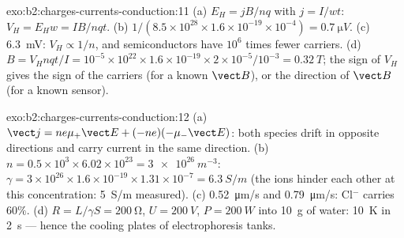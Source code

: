 \begin{solution}{exo:b2:charges-currents-conduction:11}
(a) $E_H = jB/nq$ with $j = I/wt$: $V_H = E_Hw = IB/nqt$. (b) $1/(8.5 \times 10^{28}
\times 1.6 \times 10^{-19} \times 10^{-4}) = \qty{0.7}{\micro V}$. (c) \qty{6.3}{mV}: $V_H \propto 1/n$,
and semiconductors have $10^6$ times fewer carriers. (d) $B = V_Hnqt/I =
10^{-5} \times 10^{22} \times 1.6 \times 10^{-19} \times 2 \times 10^{-5}/10^{-3} = \qty{0.32}{T}$; the sign
of $V_H$ gives the sign of the carriers (for a known $\vect B$), or the
direction of $\vect B$ (for a known sensor).
\end{solution}

\begin{solution}{exo:b2:charges-currents-conduction:12}
(a) $\vect j = ne\mu_+\vect E + (-ne)(-\mu_-\vect E)$: both species drift in
opposite directions and carry current in the same direction. (b) $n =
0.5 \times 10^3 \times 6.02 \times 10^{23} = \qty{3e26}{m^{-3}}$: $\gamma = 3 \times 10^{26} \times 1.6 \times 10^{-19}
\times 1.31 \times 10^{-7} = \qty{6.3}{S/m}$ (the ions hinder each other at this
concentration: \qty{5}{S/m} measured). (c) \qty{0.52}{\micro m/s} and \qty{0.79}{\micro m/s}:
Cl$^-$ carries $60\%$. (d) $R = L/\gamma S = \qty{200}{\ohm}$, $U = \qty{200}{V}$, $P =
\qty{200}{W}$ into \qty{10}{g} of water: \qty{10}{K} in \qty{2}{s} --- hence the cooling
plates of electrophoresis tanks.
\end{solution}

